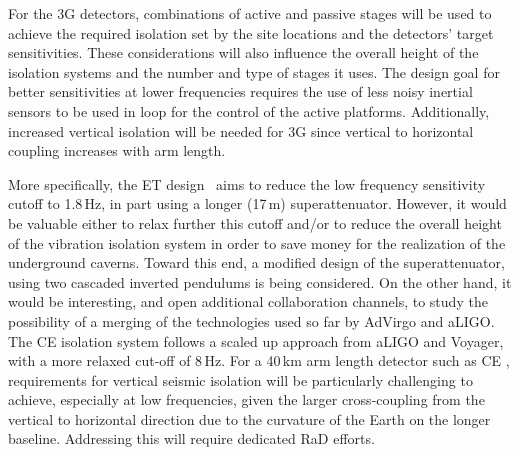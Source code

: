 
 For the \ac{3G} detectors, combinations of active and passive stages will be used to achieve the required isolation set by the site locations and the detectors' target sensitivities.
These considerations will also influence the overall height of the isolation systems and the number and type of stages it uses.
The design goal for better sensitivities at lower frequencies requires the use of less noisy inertial sensors to be used in loop for the control of the active platforms.
Additionally, increased vertical isolation will be needed for \ac{3G} since vertical to horizontal coupling increases with arm length. 

More specifically, the \ac{ET} design~\cite{ET2011} aims to reduce the low frequency sensitivity cutoff to 1.8\,Hz, in part using a longer (17\,m) superattenuator. However, it would be valuable either to relax further this cutoff and/or to reduce the overall height of the vibration isolation system in order to save money for the realization of the underground caverns. Toward this end, a modified design of the superattenuator, using two cascaded inverted pendulums is being considered. On the other hand, it would be interesting, and open additional collaboration channels, to study the possibility of a merging of the technologies used so far by \ac{AdVirgo} and \ac{aLIGO}. 
The \ac{CE}  isolation system follows a scaled up approach from \ac{aLIGO} and \ac{Voyager}, with a more relaxed cut-off of 8\,Hz. For a 40\,km arm length detector such as \ac{CE} , requirements for vertical seismic isolation will be particularly challenging to achieve, especially at low frequencies, given the larger cross-coupling from the vertical to horizontal direction due to the curvature of the Earth on the longer baseline. Addressing this will require dedicated \ac{RaD} efforts.

